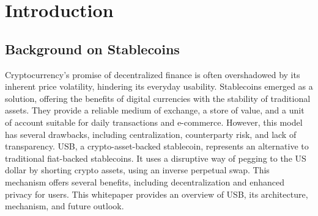 \setcounter{page}{1} %
\renewcommand\thesection{\Roman{section}}
\renewcommand\thesubsection{\Alph{subsection}}
\section{Introduction} %
\subsection{Background on Stablecoins} %
Cryptocurrency's promise of decentralized finance is often overshadowed by its inherent price volatility, hindering its everyday usability. Stablecoins emerged as a solution, offering the benefits of digital currencies with the stability of traditional assets. They provide a reliable medium of exchange, a store of value, and a unit of account suitable for daily transactions and e-commerce. 
However, this model has several drawbacks, including centralization, counterparty risk, and lack of transparency.\newline
USB, a crypto-asset-backed stablecoin, represents an alternative to traditional fiat-backed stablecoins. 
It uses a disruptive way of pegging to the US dollar by shorting crypto assets, using an inverse perpetual swap. 
This mechanism offers several benefits, including decentralization and enhanced privacy for users. 
This whitepaper provides an overview of USB, its architecture, mechanism, and future outlook.
 

